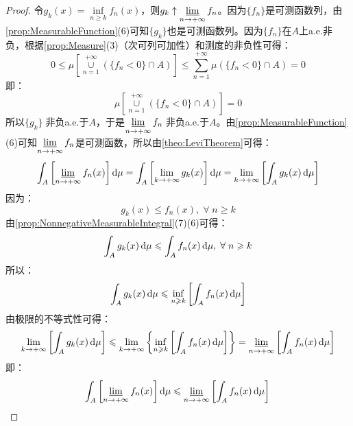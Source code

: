 \begin{proof}
	令$g_k(x)=\inf\limits_{n\geqslant k}f_n(x)$，则$g_k\uparrow\varliminf\limits_{n\to+\infty}f_n$。因为$\{f_n\}$是可测函数列，由\cref{prop:MeasurableFunction}(6)可知$\{g_k\}$也是可测函数列。因为$\{f_n\}$在$A$上a.e.非负，根据\cref{prop:Measure}(3)（次可列可加性）和测度的非负性可得：
	\begin{equation*}
		0\leqslant\mu\left[\underset{n=1}{\overset{+\infty}{\cup}}(\{f_n<0\}\cap A)\right]\leqslant\sum_{n=1}^{+\infty}\mu(\{f_n<0\}\cap A)=0
	\end{equation*}
	即：
	\begin{equation*}
		\mu\left[\underset{n=1}{\overset{+\infty}{\cup}}(\{f_n<0\}\cap A)\right]=0
	\end{equation*}
	所以$\{g_k\}\;$非负a.e.于$A$，于是$\varliminf\limits_{n\to+\infty}f_n\;$非负a.e.于$A$。由\cref{prop:MeasurableFunction}(6)可知$\varliminf\limits_{n\to+\infty}f_n$是可测函数，所以由\cref{theo:LeviTheorem}可得：
	\begin{align*}
		\int_{A}\left[\varliminf_{n\to+\infty}f_n(x)\right]\mathop{}\!\mathrm{d}\mu=\int_{A}\left[\lim_{k\to+\infty}g_k(x)\right]\mathop{}\!\mathrm{d}\mu=\lim_{k\to+\infty}\left[\int_{A}g_k(x)\mathop{}\!\mathrm{d}\mu\right]
	\end{align*}
	因为：
	\begin{equation*}
		g_k(x)\leqslant f_n(x),\;\forall\;n\geqslant k
	\end{equation*}
	由\cref{prop:NonnegativeMeasurableIntegral}(7)(6)可得：
	\begin{equation*}
		\int_{A}g_k(x)\mathop{}\!\mathrm{d}\mu\leqslant\int_{A}f_n(x)\mathop{}\!\mathrm{d}\mu,\;\forall\;n\geqslant k
	\end{equation*}
	所以：
	\begin{equation*}
		\int_{A}g_k(x)\mathop{}\!\mathrm{d}\mu\leqslant\inf_{n\geqslant k}\left[\int_{A}f_n(x)\mathop{}\!\mathrm{d}\mu\right]
	\end{equation*}
	由极限的不等式性可得：
	\begin{equation*}
		\lim_{k\to+\infty}\left[\int_{A}g_k(x)\mathop{}\!\mathrm{d}\mu\right]\leqslant\lim_{k\to+\infty}\left\{\inf_{n\geqslant k}\left[\int_{A}f_n(x)\mathop{}\!\mathrm{d}\mu\right]\right\}=\varliminf_{n\to+\infty}\left[\int_{A}f_n(x)\mathop{}\!\mathrm{d}\mu\right]
	\end{equation*}
	即：
	\begin{equation*}
		\int_{A}\left[\varliminf_{n\to+\infty}f_n(x)\right]\mathop{}\!\mathrm{d}\mu\leqslant\varliminf_{n\to+\infty}\left[\int_{A}f_n(x)\mathop{}\!\mathrm{d}\mu\right]\qedhere
	\end{equation*}
\end{proof}
